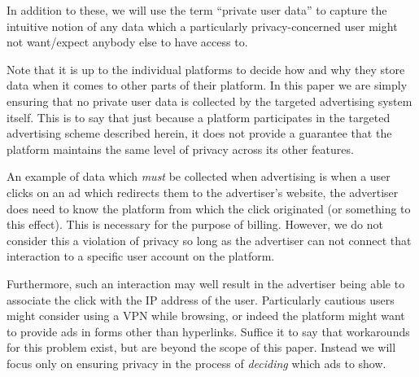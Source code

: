 In addition to these, we will use the term ``private user data'' to capture the intuitive notion of any data which a particularly privacy-concerned user might not want/expect anybody else to have access to.

Note that it is up to the individual platforms to decide how and why they store data when it comes to other parts of their platform. In this paper we are simply ensuring that no private user data is collected by the targeted advertising system itself. This is to say that just because a platform participates in the targeted advertising scheme described herein, it does not provide a guarantee that the platform maintains the same level of privacy across its other features.

An example of data which \textit{must} be collected when advertising is when a user clicks on an ad which redirects them to the advertiser's website, the advertiser does need to know the platform from which the click originated (or something to this effect). This is necessary for the purpose of billing. However, we do not consider this a violation of privacy so long as the advertiser can not connect that interaction to a specific user account on the platform.

Furthermore, such an interaction may well result in the advertiser being able to associate the click with the IP address of the user. Particularly cautious users might consider using a VPN while browsing, or indeed the platform might want to provide ads in forms other than hyperlinks. Suffice it to say that workarounds for this problem exist, but are beyond the scope of this paper. Instead we will focus only on ensuring privacy in the process of \textit{deciding} which ads to show.
